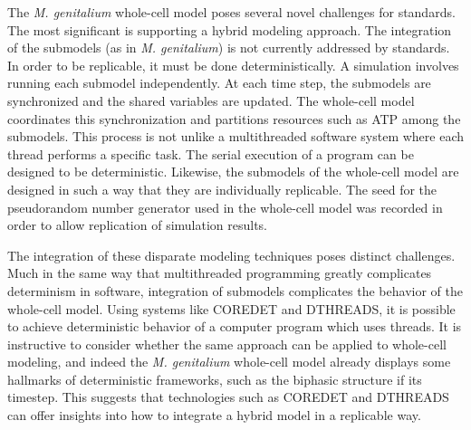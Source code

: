 \documentclass[journal,transmag,twoside]{IEEEtran}
\begin{document}

The \textit{M. genitalium} whole-cell model poses several novel challenges for standards.
The most significant is supporting a hybrid modeling approach.
The integration of the submodels (as in \textit{M. genitalium}) is not currently
addressed by standards. In order to be replicable, it must be done deterministically.
A simulation involves running each submodel independently. At each time step,
the submodels are synchronized and the shared variables are updated.
The whole-cell model coordinates this synchronization and partitions resources such as ATP
among the submodels.
This process is not unlike a multithreaded software system where each thread performs
a specific task. The serial execution of a program can be designed to be deterministic.
Likewise, the submodels of the whole-cell model are designed in such a way that
they are individually replicable. The seed for the pseudorandom number generator
used in the whole-cell model was recorded in order to allow replication of simulation results.

The integration of these disparate modeling techniques poses distinct challenges.
Much in the same way that multithreaded programming greatly complicates
determinism in software, integration of submodels complicates the behavior
of the whole-cell model.
Using systems like C{\small ORE}D{\small ET} and D{\small THREADS}, it is possible
to achieve deterministic behavior of a computer program which uses threads.
It is instructive to consider whether the same approach can be applied to whole-cell
modeling, and indeed the \textit{M. genitalium} whole-cell model already displays
some hallmarks of deterministic frameworks, such as the biphasic structure if its timestep.
This suggests that technologies such as C{\small ORE}D{\small ET} and D{\small THREADS}
can offer insights into how to integrate a hybrid model in a replicable way.
\end{document}
